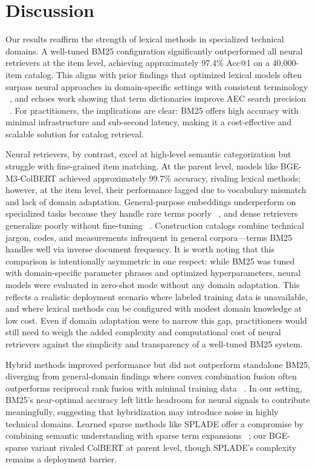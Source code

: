 \documentclass[preprint,12pt]{elsarticle}
\begin{document}
\section{Discussion}
\label{sec:discussion}

Our results reaffirm the strength of lexical methods in specialized technical domains. A well-tuned BM25 configuration significantly outperformed all neural retrievers at the item level, achieving approximately 97.4\% Acc@1 on a 40,000-item catalog. This aligns with prior findings that optimized lexical models often surpass neural approaches in domain-specific settings with consistent terminology ~\cite{thakur2021beir}, and echoes work showing that term dictionaries improve AEC search precision ~\cite{fan2015project}. For practitioners, the implications are clear: BM25 offers high accuracy with minimal infrastructure and sub-second latency, making it a cost-effective and scalable solution for catalog retrieval.

Neural retrievers, by contrast, excel at high-level semantic categorization but struggle with fine-grained item matching. At the parent level, models like BGE-M3-ColBERT achieved approximately 99.7\% accuracy, rivaling lexical methods; however, at the item level, their performance lagged due to vocabulary mismatch and lack of domain adaptation. General-purpose embeddings underperform on specialized tasks because they handle rare terms poorly ~\cite{tang2024we}, and dense retrievers generalize poorly without fine-tuning ~\cite{li2022domain}. Construction catalogs combine technical jargon, codes, and measurements infrequent in general corpora—terms BM25 handles well via inverse document frequency. It is worth noting that this comparison is intentionally asymmetric in one respect: while BM25 was tuned with domain-specific parameter phrases and optimized hyperparameters, neural models were evaluated in zero-shot mode without any domain adaptation. This reflects a realistic deployment scenario where labeled training data is unavailable, and where lexical methods can be configured with modest domain knowledge at low cost. Even if domain adaptation were to narrow this gap, practitioners would still need to weigh the added complexity and computational cost of neural retrievers against the simplicity and transparency of a well-tuned BM25 system.

Hybrid methods improved performance but did not outperform standalone BM25, diverging from general-domain findings where convex combination fusion often outperforms reciprocal rank fusion with minimal training data ~\cite{bruch2023analysis}. In our setting, BM25's near-optimal accuracy left little headroom for neural signals to contribute meaningfully, suggesting that hybridization may introduce noise in highly technical domains. Learned sparse methods like SPLADE offer a compromise by combining semantic understanding with sparse term expansions ~\cite{formal2021splade}; our BGE-sparse variant rivaled ColBERT at parent level, though SPLADE's complexity remains a deployment barrier.
\end{document}
